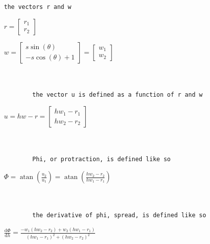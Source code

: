 \documentclass[11pt]{article}
\begin{document}
            \begin{Verbatim}[commandchars=\\\{\}]
        the vectors r and w
            \end{Verbatim}

            $\displaystyle r = \left[\begin{matrix}r_{1}\\r_{2}\end{matrix}\right]$

            
            $\displaystyle w = \left[\begin{matrix}s \sin{\left(\theta \right)}\\- s \cos{\left(\theta \right)} + 1\end{matrix}\right] = \left[\begin{matrix}w_{1}\\w_{2}\end{matrix}\right]$

            
            \begin{Verbatim}[commandchars=\\\{\}]


        the vector u is defined as a function of r and w
            \end{Verbatim}

            $\displaystyle u = h w - r = \left[\begin{matrix}h w_{1} - r_{1}\\h w_{2} - r_{2}\end{matrix}\right]$

            
            \begin{Verbatim}[commandchars=\\\{\}]


        Phi, or protraction, is defined like so
            \end{Verbatim}

            $\displaystyle \Phi = \operatorname{atan}{\left(\frac{u_{2}}{u_{1}} \right)} = \operatorname{atan}{\left(\frac{h w_{2} - r_{2}}{h w_{1} - r_{1}} \right)}$

            
            \begin{Verbatim}[commandchars=\\\{\}]


        the derivative of phi, spread, is defined like so
            \end{Verbatim}

            $\displaystyle \frac{\mathrm{d}\Phi}{\mathrm{d}h} = \frac{- w_{1} \left(h w_{2} - r_{2}\right) + w_{2} \left(h w_{1} - r_{1}\right)}{\left(h w_{1} - r_{1}\right)^{2} + \left(h w_{2} - r_{2}\right)^{2}}$
\end{document}
